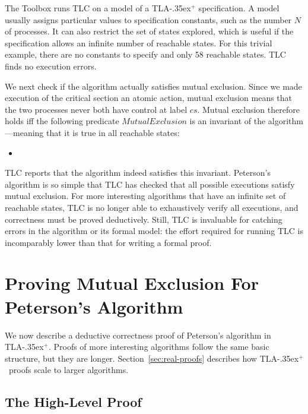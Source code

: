 \documentclass[a4paper]{llncs}
\newcommand{\tlaplus}{\mbox{TLA\kern -.35ex$^+$}\xspace}
\newenvironment{display}{\begin{itemize}\item[]}{\end{itemize}}
\begin{document}
The Toolbox runs TLC on a model of a \tlaplus specification.  A model
usually assigns particular values to specification constants, such as
the number $N$ of processes. It can also restrict the set of states
explored, which is useful if the specification allows an infinite number
of reachable states.  For this trivial example, there are no constants
to specify and only 58 reachable states.  TLC finds no execution
errors.

We next check if the algorithm actually satisfies mutual exclusion.
Since we made execution of the critical section an atomic action,
mutual exclusion means that the two processes never both have control
at label $cs$.  Mutual exclusion therefore holds iff the
following predicate $MutualExclusion$ is an invariant of the
algorithm---meaning that it is true in all reachable states:
%
\begin{display}
\begin{tlatex}
\end{tlatex}
\end{display}
%
TLC reports that the algorithm indeed satisfies this invariant. Peterson's
algorithm is so simple that TLC has checked that all possible
executions satisfy mutual exclusion. For more interesting algorithms that have
an infinite set of reachable states, TLC is no longer able to exhaustively
verify all executions, and correctness must be proved deductively. Still, TLC is
invaluable for catching errors in the algorithm or its formal model: the
effort required for running TLC is incomparably lower than that for writing a
formal proof.


\section{Proving Mutual Exclusion For Peterson's Algorithm}
\label{sec:proving}

We now describe a deductive correctness proof of Peterson's
algorithm in \tlaplus. Proofs of more interesting algorithms follow the same
basic structure, but they are longer.
Section~\ref{sec:real-proofs} describes how \tlaplus\ proofs scale to larger
algorithms.

\subsection{The High-Level Proof}
\label{sec:high-level-proof}
\end{document}
